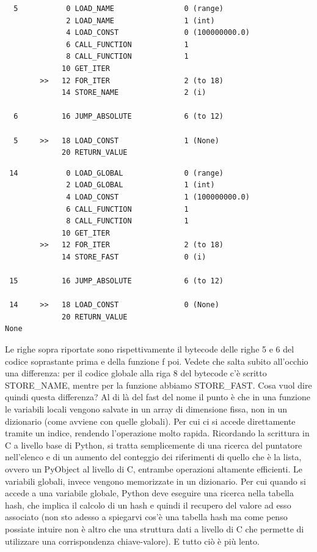 \documentclass[10pt,a4paper]{article}
\begin{document}
\begin{lstlisting}
  5           0 LOAD_NAME                0 (range)
              2 LOAD_NAME                1 (int)
              4 LOAD_CONST               0 (100000000.0)
              6 CALL_FUNCTION            1
              8 CALL_FUNCTION            1
             10 GET_ITER
        >>   12 FOR_ITER                 2 (to 18)
             14 STORE_NAME               2 (i)

  6          16 JUMP_ABSOLUTE            6 (to 12)

  5     >>   18 LOAD_CONST               1 (None)
             20 RETURN_VALUE
\end{lstlisting}
\begin{lstlisting}
 14           0 LOAD_GLOBAL              0 (range)
              2 LOAD_GLOBAL              1 (int)
              4 LOAD_CONST               1 (100000000.0)
              6 CALL_FUNCTION            1
              8 CALL_FUNCTION            1
             10 GET_ITER
        >>   12 FOR_ITER                 2 (to 18)
             14 STORE_FAST               0 (i)

 15          16 JUMP_ABSOLUTE            6 (to 12)

 14     >>   18 LOAD_CONST               0 (None)
             20 RETURN_VALUE
None
\end{lstlisting}
Le righe sopra riportate sono rispettivamente il bytecode delle righe 5 e 6 del codice soprastante prima e della funzione f poi. Vedete che salta subito all'occhio una differenza: per il codice globale alla riga 8 del bytecode c'è scritto STORE\_NAME, mentre per la funzione abbiamo STORE\_FAST. Cosa vuol dire quindi questa differenza? Al di là del fast del nome il punto è che in una funzione le variabili locali vengono salvate in un array di dimensione fissa, non in un dizionario (come avviene con quelle globali). Per cui ci si accede direttamente tramite un indice, rendendo l'operazione molto rapida. Ricordando la scrittura in C a livello base di Python, si tratta semplicemente di una ricerca del puntatore nell'elenco e di un aumento del conteggio dei riferimenti di quello che è la lista, ovvero un PyObject al livello di C, entrambe operazioni altamente efficienti.
Le variabili globali, invece vengono memorizzate in un dizionario. Per cui quando si accede a una variabile globale, Python deve eseguire una ricerca nella tabella hash, che implica il calcolo di un hash e quindi il recupero del valore ad esso associato (non sto adesso a spiegarvi cos'è una tabella hash ma come penso possiate intuire non è altro che una struttura dati a livello di C che permette di utilizzare una corrispondenza chiave-valore). E tutto ciò è più lento.
\end{document}
